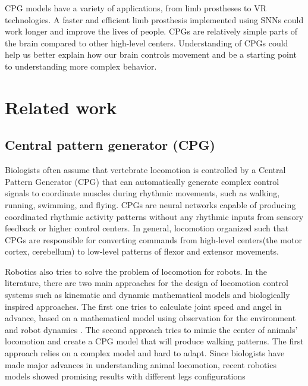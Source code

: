 \documentclass[runningheads]{llncs}
\begin{document}
CPG models have a variety of applications, from limb prostheses to VR technologies. A faster and efficient limb prosthesis implemented using SNNs could work longer and improve the lives of people. 
CPGs are relatively simple parts of the brain compared to other high-level centers. Understanding of CPGs could help us better explain how our brain controls movement and be a starting point to understanding more complex behavior.


\section{Related work}
\subsection{Central pattern generator (CPG)}
Biologists often assume that vertebrate locomotion is controlled by a Central Pattern Generator (CPG) that can automatically generate complex control signals to coordinate muscles during rhythmic movements, such as walking, running, swimming, and flying. CPGs are neural networks capable of producing coordinated rhythmic activity patterns without any rhythmic inputs from sensory feedback or higher control centers. In general, locomotion organized such that CPGs are responsible for converting commands from high-level centers(the motor cortex, cerebellum) to low-level patterns of flexor and extensor movements\cite{ref1}. 

Robotics also tries to solve the problem of locomotion for robots. In the literature, there are two main approaches for the design of locomotion control systems such as kinematic and dynamic mathematical models and biologically inspired approaches\cite{ref1}. The first one tries to calculate joint speed and angel in advance, based on a mathematical model using observation for the environment and robot dynamics \cite{ref10}. The second approach tries to mimic the center of animals' locomotion and create a CPG model that will produce walking patterns. The first approach relies on a complex model and hard to adapt. Since biologists have made major advances in understanding animal locomotion, recent robotics models showed promising results with different legs configurations\cite{ref11}\cite{ref12}
\end{document}
